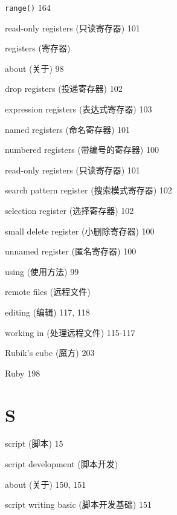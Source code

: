 \begin{multicols}{2}
\hangindent=2pc  \texttt{range()} 164

\hangindent=2pc  read-only registers (只读寄存器) 101

\hangindent=2pc  registers (寄存器) \par
\hangindent=2pc \quad about (关于) 98 \par
\hangindent=2pc \quad drop registers (投递寄存器) 102 \par
\hangindent=2pc \quad expression registers (表达式寄存器) 103 \par
\hangindent=2pc \quad named registers (命名寄存器) 101 \par
\hangindent=2pc \quad numbered registers (带编号的寄存器) 100 \par
\hangindent=2pc \quad read-only registers (只读寄存器) 101 \par
\hangindent=2pc \quad search pattern register (搜索模式寄存器) 102 \par
\hangindent=2pc \quad selection register (选择寄存器) 102 \par
\hangindent=2pc \quad small delete register (小删除寄存器) 100 \par
\hangindent=2pc \quad unnamed register (匿名寄存器) 100 \par
\hangindent=2pc \quad using (使用方法) 99 \par

\hangindent=2pc  remote files (远程文件) \par
\hangindent=2pc \quad editing (编辑) 117, 118 \par
\hangindent=2pc \quad working in (处理远程文件) 115-117 \par

\hangindent=2pc  Rubik's cube (魔方) 203

\hangindent=2pc  Ruby 198

\hangindent=2pc  \section*{S}

\hangindent=2pc  script (脚本) 15

\hangindent=2pc  script development (脚本开发) \par
\hangindent=2pc \quad about (关于) 150, 151 \par
\hangindent=2pc \quad script writing basic (脚本开发基础) 151 \par


\end{multicols}
